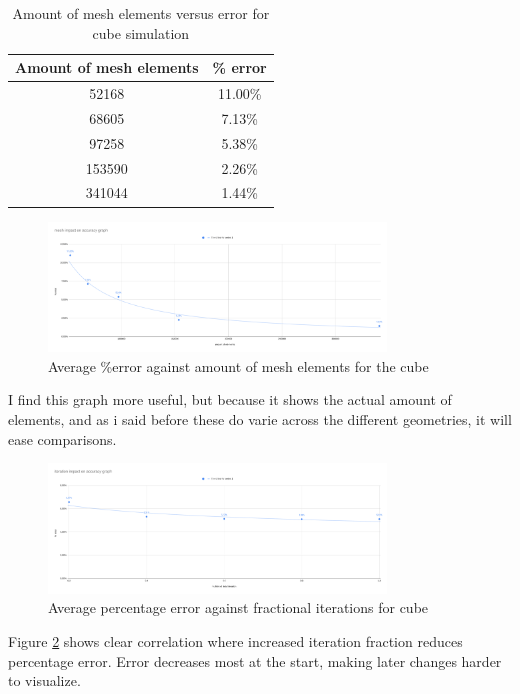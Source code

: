 \documentclass[12pt,a4paper]{article}
\begin{document}
\begin{table}[H]
\centering
\caption{Amount of mesh elements versus error for cube simulation}
\label{tab:cube_elements_error}
\begin{tabular}{|c|c|}
\hline
\rowcolor{lightblue}
\textbf{Amount of mesh elements} & \textbf{\% error} \\
\hline
52168 & 11.00\% \\
\hline
68605 & 7.13\% \\
\hline
97258 & 5.38\% \\
\hline
153590 & 2.26\% \\
\hline
341044 & 1.44\% \\
\hline
\end{tabular}
\end{table}

\begin{figure}[H]
\centering
\includegraphics[width=0.8\textwidth]{image14.png}
\caption{Average \%error against amount of mesh elements for the cube}
\label{fig:cube_elements_error}
\end{figure}

I find this graph more useful, but because it shows the actual amount of elements, and as i said before these do varie across the different geometries, it will ease comparisons.

\begin{figure}[H]
    \centering
    \includegraphics[width=0.8\textwidth]{image5.png}
    \caption{Average percentage error against fractional iterations for cube}
    \label{fig:cube_iterations_error}
\end{figure}

Figure \ref{fig:cube_iterations_error} shows clear correlation where increased iteration fraction reduces percentage error. Error decreases most at the start, making later changes harder to visualize.
\end{document}
